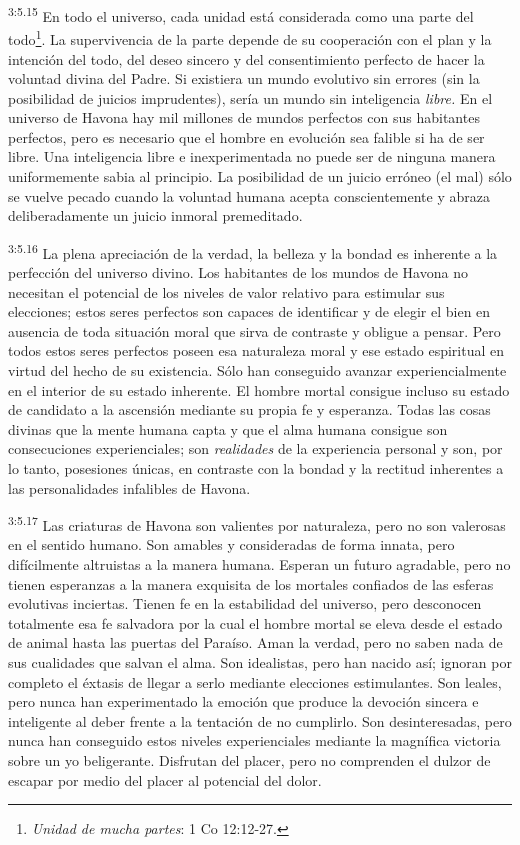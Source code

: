 \par
\textsuperscript{3:5.15} En todo el universo, cada unidad está considerada como una parte del todo\footnote{\textit{Unidad de mucha partes}: 1 Co 12:12-27.}. La supervivencia de la parte depende de su cooperación con el plan y la intención del todo, del deseo sincero y del consentimiento perfecto de hacer la voluntad divina del Padre. Si existiera un mundo evolutivo sin errores (sin la posibilidad de juicios imprudentes), sería un mundo sin inteligencia \textit{libre.} En el universo de Havona hay mil millones de mundos perfectos con sus habitantes perfectos, pero es necesario que el hombre en evolución sea falible si ha de ser libre. Una inteligencia libre e inexperimentada no puede ser de ninguna manera uniformemente sabia al principio. La posibilidad de un juicio erróneo (el mal) sólo se vuelve pecado cuando la voluntad humana acepta conscientemente y abraza deliberadamente un juicio inmoral premeditado.

\par
\textsuperscript{3:5.16} La plena apreciación de la verdad, la belleza y la bondad es inherente a la perfección del universo divino. Los habitantes de los mundos de Havona no necesitan el potencial de los niveles de valor relativo para estimular sus elecciones; estos seres perfectos son capaces de identificar y de elegir el bien en ausencia de toda situación moral que sirva de contraste y obligue a pensar. Pero todos estos seres perfectos poseen esa naturaleza moral y ese estado espiritual en virtud del hecho de su existencia. Sólo han conseguido avanzar experiencialmente en el interior de su estado inherente. El hombre mortal consigue incluso su estado de candidato a la ascensión mediante su propia fe y esperanza. Todas las cosas divinas que la mente humana capta y que el alma humana consigue son consecuciones experienciales; son \textit{realidades} de la experiencia personal y son, por lo tanto, posesiones únicas, en contraste con la bondad y la rectitud inherentes a las personalidades infalibles de Havona.

\par
\textsuperscript{3:5.17} Las criaturas de Havona son valientes por naturaleza, pero no son valerosas en el sentido humano. Son amables y consideradas de forma innata, pero difícilmente altruistas a la manera humana. Esperan un futuro agradable, pero no tienen esperanzas a la manera exquisita de los mortales confiados de las esferas evolutivas inciertas. Tienen fe en la estabilidad del universo, pero desconocen totalmente esa fe salvadora por la cual el hombre mortal se eleva desde el estado de animal hasta las puertas del Paraíso. Aman la verdad, pero no saben nada de sus cualidades que salvan el alma. Son idealistas, pero han nacido así; ignoran por completo el éxtasis de llegar a serlo mediante elecciones estimulantes. Son leales, pero nunca han experimentado la emoción que produce la devoción sincera e inteligente al deber frente a la tentación de no cumplirlo. Son desinteresadas, pero nunca han conseguido estos niveles experienciales mediante la magnífica victoria sobre un yo beligerante. Disfrutan del placer, pero no comprenden el dulzor de escapar por medio del placer al potencial del dolor.

